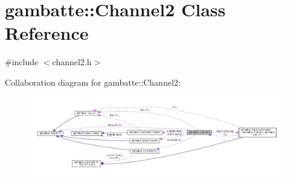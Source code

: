 \hypertarget{classgambatte_1_1Channel2}{}\section{gambatte\+:\+:Channel2 Class Reference}
\label{classgambatte_1_1Channel2}


{\ttfamily \#include $<$channel2.\+h$>$}



Collaboration diagram for gambatte\+:\+:Channel2\+:
\nopagebreak
\begin{figure}[H]
\begin{center}
\leavevmode
\includegraphics[width=350pt]{classgambatte_1_1Channel2__coll__graph}
\end{center}
\end{figure}
